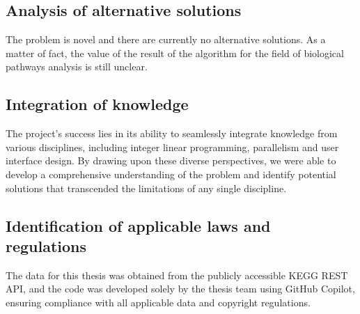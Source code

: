 \documentclass[12pt]{article}
\begin{document}
\subsection{Analysis of alternative solutions}

The problem is novel and there are currently no alternative solutions. As a matter of fact, the value of the result of the algorithm for the field of biological pathways analysis is still unclear.

\subsection{Integration of knowledge}
The project's success lies in its ability to seamlessly integrate knowledge from various disciplines, including integer linear programming, parallelism and user interface design. By drawing upon these diverse perspectives, we were able to develop a comprehensive understanding of the problem and identify potential solutions that transcended the limitations of any single discipline.

\subsection{Identification of applicable laws and regulations}

The data for this thesis was obtained from the publicly accessible KEGG REST API, and the code was developed solely by the thesis team using GitHub Copilot, ensuring compliance with all applicable data and copyright regulations.

\newpage
%


\end{document}
